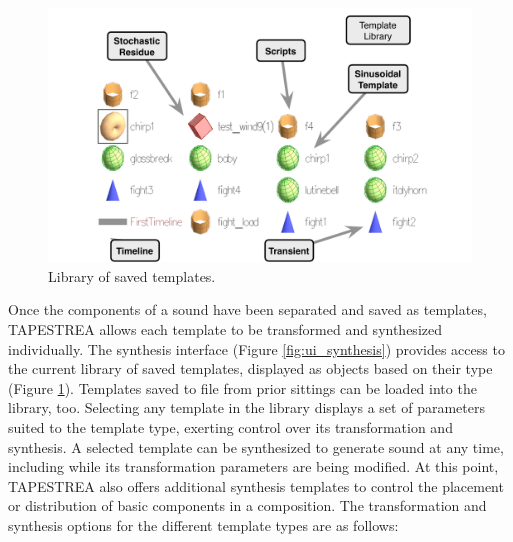 \documentclass[10pt,letterpaper]{article}
\begin{document}
\begin{figure}[h]
  \begin{center}
    \includegraphics[width=.95\columnwidth]{ui_library.pdf}
    \caption{Library of saved templates.} 
    \label{fig:ui_library}
  \end{center}
\end{figure}

Once the components of a sound have been separated and saved as
templates, TAPESTREA allows each template to be transformed and
synthesized individually. The synthesis interface (Figure \ref{fig:ui_synthesis}) provides access to the current library of saved
templates, displayed as objects based on their type (Figure \ref{fig:ui_library}). Templates saved to file from prior sittings can be loaded into the library, too. Selecting
any template in the library displays a set of parameters suited to the
template type, exerting control over its transformation and synthesis. 
A selected template can be synthesized to generate
sound at any time, including while its transformation parameters are
being modified. At this point, TAPESTREA also offers
additional synthesis templates to control the placement or distribution
of basic components in a composition. The transformation and synthesis
options for the different template types are as follows:
\end{document}

